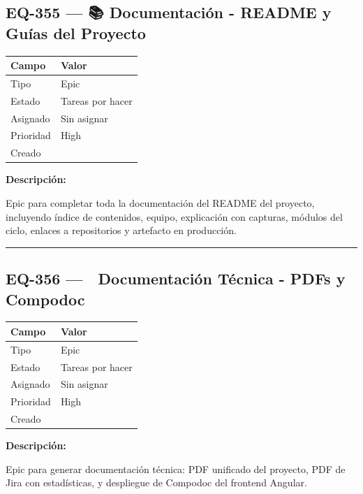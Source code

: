 \documentclass[
  spanish,
  11pt,
]{report}
\newcounter{none} %
\begin{document}
\subsection{EQ-355 --- 📚 Documentación - README y Guías del
Proyecto}\label{eq-355-documentaciuxf3n---readme-y-guuxedas-del-proyecto}

{\def\LTcaptype{none} %
\begin{longtable}[]{@{}ll@{}}
\toprule\noalign{}
Campo & Valor \\
\midrule\noalign{}
\endhead
\bottomrule\noalign{}
\endlastfoot
Tipo & Epic \\
Estado & Tareas por hacer \\
Asignado & Sin asignar \\
Prioridad & High \\
Creado & \\
\end{longtable}
}

\textbf{Descripción:}

Epic para completar toda la documentación del README del proyecto,
incluyendo índice de contenidos, equipo, explicación con capturas,
módulos del ciclo, enlaces a repositorios y artefacto en producción.

\begin{center}\rule{0.5\linewidth}{0.5pt}\end{center}

\subsection{EQ-356 --- 📖 Documentación Técnica - PDFs y
Compodoc}\label{eq-356-documentaciuxf3n-tuxe9cnica---pdfs-y-compodoc}

{\def\LTcaptype{none} %
\begin{longtable}[]{@{}ll@{}}
\toprule\noalign{}
Campo & Valor \\
\midrule\noalign{}
\endhead
\bottomrule\noalign{}
\endlastfoot
Tipo & Epic \\
Estado & Tareas por hacer \\
Asignado & Sin asignar \\
Prioridad & High \\
Creado & \\
\end{longtable}
}

\textbf{Descripción:}

Epic para generar documentación técnica: PDF unificado del proyecto, PDF
de Jira con estadísticas, y despliegue de Compodoc del frontend Angular.
\end{document}

